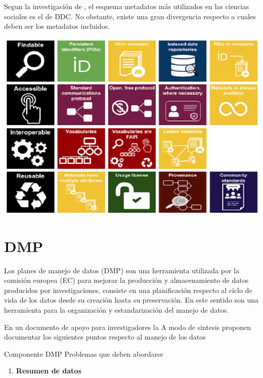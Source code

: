 \documentclass[
  14pt,
]{book}
\providecommand{\tightlist}{%
  \setlength{\itemsep}{0pt}\setlength{\parskip}{0pt}}
\let\origfigure\figure
\let\endorigfigure\endfigure
\renewenvironment{figure}[1][2] {
  \expandafter\origfigure\expandafter[H]
} {
  \endorigfigure
}
\begin{document}
Segun la investigación de \citet{gomez_Datos_2016}, el esquema metadatos más utilizados en las ciencias sociales es el de DDC. No obstante, existe una gran divergencia respecto a cuales deben ser los metadatos incluidos.

\begin{figure}[!ht]

{\centering \includegraphics[width=0.8\linewidth,]{images/FAIR_data_principles2} 

}

\end{figure}

\hypertarget{dmp}{%
\section{DMP}\label{dmp}}

Los planes de manejo de datos (DMP) son una herramienta utilizada por la comisión europea (EC) para mejorar la producción y almacenamiento de datos producidos por investigaciones, consiste en una planificación respecto al ciclo de vida de los datos desde su creación hasta su preservación. En este sentido son una herramienta para la organización y estandarización del manejo de datos.

En un documento de apoyo para investigadores la \citet{ec_FAIR_2016} A modo de sintesis proponen documentar los siguientes puntos respecto al manejo de los datos

Componente DMP Problemas que deben abordarse

\begin{enumerate}
\def\labelenumi{\arabic{enumi}.}
\tightlist
\item
  \textbf{Resumen de datos}
\end{enumerate}
\end{document}
